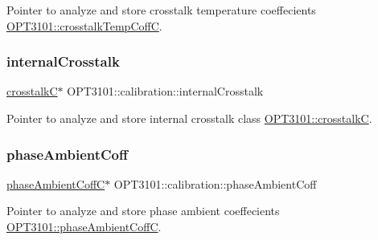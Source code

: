 Pointer to analyze and store crosstalk temperature coeffecients \mbox{\hyperlink{class_o_p_t3101_1_1crosstalk_temp_coff_c}{O\+P\+T3101\+::crosstalk\+Temp\+CoffC}}. 

\mbox{\label{class_o_p_t3101_1_1calibration_af63306e99b538aba754daa0d9f0c37a9}} 
\subsubsection{\texorpdfstring{internal\+Crosstalk}{internalCrosstalk}}
{\footnotesize\ttfamily \mbox{\hyperlink{class_o_p_t3101_1_1crosstalk_c}{crosstalkC}}$\ast$ O\+P\+T3101\+::calibration\+::internal\+Crosstalk}



Pointer to analyze and store internal crosstalk class \mbox{\hyperlink{class_o_p_t3101_1_1crosstalk_c}{O\+P\+T3101\+::crosstalkC}}. 

\mbox{\label{class_o_p_t3101_1_1calibration_a6b2447d419a5f3544b648aaa618288a9}} 
\subsubsection{\texorpdfstring{phase\+Ambient\+Coff}{phaseAmbientCoff}}
{\footnotesize\ttfamily \mbox{\hyperlink{class_o_p_t3101_1_1phase_ambient_coff_c}{phase\+Ambient\+CoffC}}$\ast$ O\+P\+T3101\+::calibration\+::phase\+Ambient\+Coff}



Pointer to analyze and store phase ambient coeffecients \mbox{\hyperlink{class_o_p_t3101_1_1phase_ambient_coff_c}{O\+P\+T3101\+::phase\+Ambient\+CoffC}}. 

\mbox{\label{class_o_p_t3101_1_1calibration_abd318f8905f1e1834c3b21910a91c6a8}} 
